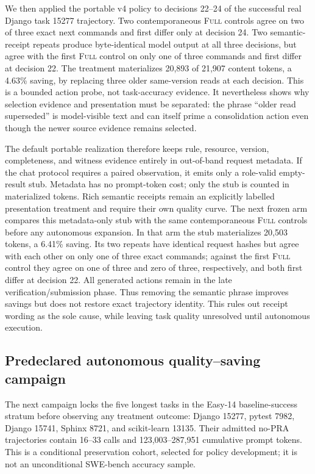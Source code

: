 \documentclass[11pt]{article}
\begin{document}
We then applied the portable v4 policy to decisions 22--24 of the successful
real Django task 15277 trajectory.  Two contemporaneous
\textsc{Full} controls agree on two of three exact next commands and first
differ only at decision 24.  Two semantic-receipt repeats produce
byte-identical model output at all three decisions, but agree with the first
\textsc{Full} control on only one of three commands and first differ at
decision 22.  The treatment materializes 20,893 of 21,907 content tokens, a
4.63\% saving, by replacing three older same-version reads at each decision.
This is a bounded action probe, not task-accuracy evidence.  It nevertheless
shows why selection evidence and presentation must be separated: the phrase
``older read superseded'' is model-visible text and can itself prime a
consolidation action even though the newer source evidence remains selected.

The default portable realization therefore keeps rule, resource, version,
completeness, and witness evidence entirely in out-of-band request metadata.
If the chat protocol requires a paired observation, it emits only a role-valid
empty-result stub.  Metadata has no prompt-token cost; only the stub is counted
in materialized tokens.  Rich semantic receipts remain an explicitly labelled
presentation treatment and require their own quality curve.  The next frozen
arm compares this metadata-only stub with the same contemporaneous
\textsc{Full} controls before any autonomous expansion.  In that arm the stub
materializes 20,503 tokens, a 6.41\% saving.  Its two repeats have identical
request hashes but agree with each other on only one of three exact commands;
against the first \textsc{Full} control they agree on one of three and zero of
three, respectively, and both first differ at decision 22.  All generated
actions remain in the late verification/submission phase.  Thus removing the
semantic phrase improves savings but does not restore exact trajectory
identity.  This rules out receipt wording as the sole cause, while leaving task
quality unresolved until autonomous execution.

\subsection{Predeclared autonomous quality--saving campaign}

The next campaign locks the five longest tasks in the Easy-14 baseline-success
stratum before observing any treatment outcome: Django 15277, pytest 7982,
Django 15741, Sphinx 8721, and scikit-learn 13135.  Their admitted no-PRA
trajectories contain 16--33 calls and 123,003--287,951 cumulative prompt
tokens.  This is a conditional preservation cohort, selected for policy
development; it is not an unconditional SWE-bench accuracy sample.
\end{document}
